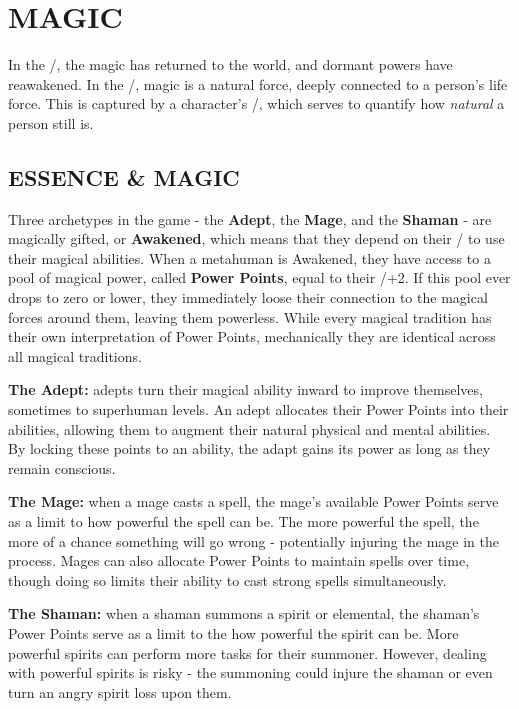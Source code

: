 \documentclass[oneside,10pt]{article}
\begin{document}
\section{MAGIC}
\label{magic}
\begin{multicols}{2}
In the \SW/, the magic has returned to the world,
and dormant powers have reawakened. In the \SW/, magic is a natural
force, deeply connected to a person's life force. This is captured by
a character's \essence/, which serves to quantify how \textit{natural}
a person still is. 

\subsection{ESSENCE \& MAGIC}
Three archetypes in the game - the \textbf{Adept}, the \textbf{Mage},
and the \textbf{Shaman} - are magically gifted, or \textbf{Awakened},
which means that they depend on their \essence/ to use their magical
abilities. When a metahuman is Awakened, they have access to a pool of
magical power, called \textbf{Power Points}, equal to their
\essence/+2. If this pool ever drops to zero or lower, they
immediately loose their connection to the magical forces around them,
leaving them powerless. While every magical tradition has their own
interpretation of Power Points, mechanically they are identical across
all magical traditions.

\begin{dent}
  \textbf{The Adept:} adepts turn their magical ability inward to
  improve themselves, sometimes to superhuman levels. An adept
  allocates their Power Points into their abilities, allowing them to
  augment their natural physical and mental abilities. By locking
  these points to an ability, the adapt gains its power as long as
  they remain conscious. 

  \textbf{The Mage:} when a mage casts a spell, the mage's available
  Power Points serve as a limit to how powerful the spell can be. The more
  powerful the spell, the more of a chance something will go wrong -
  potentially injuring the mage in the process. Mages can also
  allocate Power Points to maintain spells over time, though doing so
  limits their ability to cast strong spells simultaneously.

  \textbf{The Shaman:} when a shaman summons a spirit or elemental,
  the shaman's Power Points serve as a limit to the how powerful the
  spirit can be. More powerful spirits can perform more tasks for
  their summoner. However, dealing with powerful spirits is risky -
  the summoning could injure the shaman or even turn an angry spirit
  loss upon them.
\end{dent}


\end{multicols}
\end{document}
